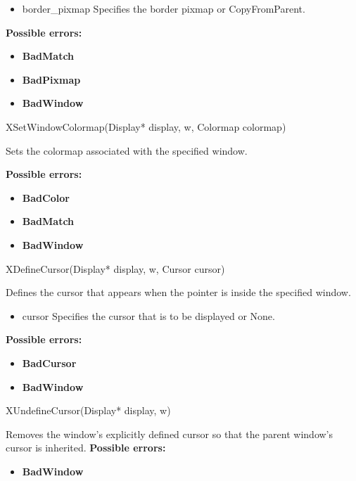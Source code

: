 \documentclass{report}
\begin{document}
\begin{itemize}
            \begin{itemize}
                \item border\_pixmap Specifies the border pixmap or CopyFromParent.
            \end{itemize}

            \bigbreak \noindent
            \textbf{Possible errors:}
            \begin{itemize}
                \item \textbf{BadMatch}
                \item \textbf{BadPixmap}
                \item \textbf{BadWindow}
            \end{itemize}

            \begin{cppcode}
                XSetWindowColormap(Display* display, w, Colormap colormap)
            \end{cppcode}
            \bigbreak \noindent
            Sets the colormap associated with the specified window.

            \bigbreak \noindent
            \textbf{Possible errors:}
            \begin{itemize}
                \item \textbf{BadColor}
                \item \textbf{BadMatch}
                \item \textbf{BadWindow}
            \end{itemize}

            \begin{cppcode}
                XDefineCursor(Display* display, w, Cursor cursor)
            \end{cppcode}
            \bigbreak \noindent
            Defines the cursor that appears when the pointer is inside the specified window.
            \begin{itemize}
                \item cursor Specifies the cursor that is to be displayed or None.
            \end{itemize}
            \bigbreak \noindent
            \textbf{Possible errors:}
            \begin{itemize}
                \item \textbf{BadCursor}
                \item \textbf{BadWindow}
            \end{itemize}

            \begin{cppcode}
                XUndefineCursor(Display* display, w)
            \end{cppcode}
            \bigbreak \noindent
            Removes the window's explicitly defined cursor so that the parent window's cursor is inherited.
            \bigbreak \noindent
            \textbf{Possible errors:}
            \begin{itemize}
                \item \textbf{BadWindow}
            \end{itemize}


    \end{itemize}
\end{document}
